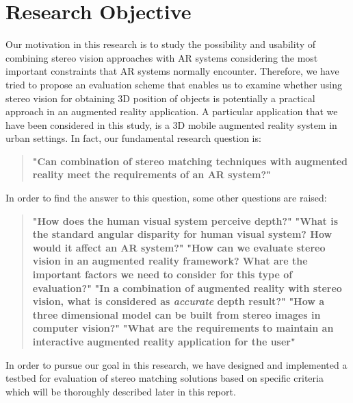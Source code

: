 \section {Research Objective}

Our motivation in this research is to study the possibility and usability of combining stereo vision approaches with AR systems considering the most important constraints that AR systems
normally encounter. Therefore, we have tried to propose an evaluation scheme that enables us to examine whether using stereo vision
for obtaining 3D position of objects is potentially a practical approach in an augmented reality application. A particular application that we have been considered in
this study, is a 3D mobile augmented reality system in urban settings. 
In fact, our fundamental research question is: \newline

\begin{quote}
\textbf{"Can combination of stereo matching techniques with augmented reality meet the requirements of an AR system?"} \newline
\end{quote}

In order to find the answer to this question, some other questions are raised:
\begin{quote}
\textbf {"How does the human visual system perceive depth?"}\newline
\textbf {"What is the standard angular disparity for human visual system? How would it affect an AR system?"} \newline
\textbf {"How can we evaluate stereo vision in an augmented reality framework? What are the important factors we need to consider for 
	this type of evaluation?"} \newline
\textbf {"In a combination of augmented reality with stereo vision, what is considered as \textbf{\textit {accurate}} depth result?"} \newline
\textbf {"How a three dimensional model can be built from stereo images in computer vision?"}\newline
\textbf {"What are the requirements to maintain an interactive augmented reality application for the user"} \newline
\end{quote}

In order to pursue our goal in this research, we have designed and implemented a testbed for evaluation of
stereo matching solutions based on specific criteria which will be thoroughly described later in this report.


